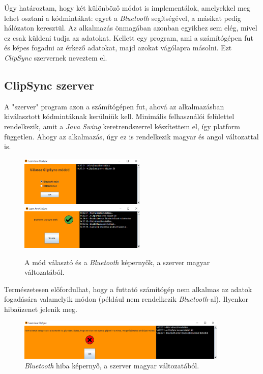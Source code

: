 \documentclass[12pt,a4paper]{article}
\begin{document}
	Úgy határoztam, hogy két különböző módot is implementálok, amelyekkel meg lehet osztani a kódmintákat: egyet a \textit{Bluetooth} segítségével, a másikat pedig hálózaton keresztül. Az alkalmazás önmagában azonban egyikhez sem elég, mivel ez csak küldeni tudja az adatokat. Kellett egy program, ami a számítógépen fut és képes fogadni az érkező adatokat, majd azokat vágólapra másolni. Ezt \textit{ClipSync} szervernek neveztem el.
	
	\subsection{ClipSync szerver}
	
	A "szerver" program azon a számítógépen fut, ahová az alkalmazásban kiválasztott kódmintáknak kerülniük kell. Minimális felhasználói felülettel rendelkezik, amit a \textit{Java Swing} keretrendszerrel készítettem el, így platform független. Ahogy az alkalmazás, úgy ez is rendelkezik magyar és angol változattal is.
	
	\begin{figure}[h!]
		\includegraphics[width=6cm]{clipsync_server_select}\hfill
		\includegraphics[width=6cm]{clipsync_server_bluetooth}
		\caption{A mód választó és a \textit{Bluetooth} képernyők, a szerver magyar változatából.}
	\end{figure}

	Természetesen előfordulhat, hogy a futtató számítógép nem alkalmas az adatok fogadására valamelyik módon (például nem rendelkezik \textit{Bluetooth}-al). Ilyenkor hibaüzenet jelenik meg.
	
	\begin{figure}[h!]
		\centering
		\includegraphics[width=10cm]{clipsync_server_error}
		\caption{\textit{Bluetooth} hiba képernyő, a szerver magyar változatából.}
	\end{figure}
	
\end{document}
